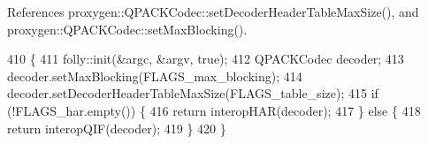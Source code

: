 References proxygen\+::\+Q\+P\+A\+C\+K\+Codec\+::set\+Decoder\+Header\+Table\+Max\+Size(), and proxygen\+::\+Q\+P\+A\+C\+K\+Codec\+::set\+Max\+Blocking().


\begin{DoxyCode}
410                                 \{
411   folly::init(&argc, &argv, \textcolor{keyword}{true});
412   QPACKCodec decoder;
413   decoder.setMaxBlocking(FLAGS\_max\_blocking);
414   decoder.setDecoderHeaderTableMaxSize(FLAGS\_table\_size);
415   \textcolor{keywordflow}{if} (!FLAGS\_har.empty()) \{
416     \textcolor{keywordflow}{return} interopHAR(decoder);
417   \} \textcolor{keywordflow}{else} \{
418     \textcolor{keywordflow}{return} interopQIF(decoder);
419   \}
420 \}
\end{DoxyCode}

